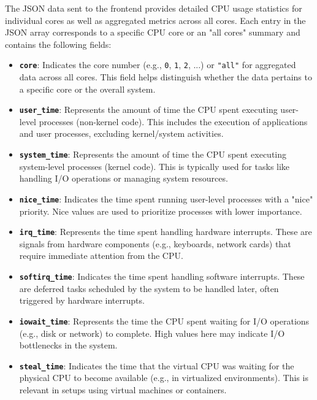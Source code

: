 \documentclass[12pt]{article}
\begin{document}
The JSON data sent to the frontend provides detailed CPU usage statistics for individual cores as well as aggregated metrics across all cores. Each entry in the JSON array corresponds to a specific CPU core or an "all cores" summary and contains the following fields:

\begin{itemize}
    \item \textbf{\texttt{core}}:  
    Indicates the core number (e.g., \texttt{0}, \texttt{1}, \texttt{2}, ...) or \texttt{"all"} for aggregated data across all cores. This field helps distinguish whether the data pertains to a specific core or the overall system.

    \item \textbf{\texttt{user\_time}}:  
    Represents the amount of time the CPU spent executing user-level processes (non-kernel code). This includes the execution of applications and user processes, excluding kernel/system activities.

    \item \textbf{\texttt{system\_time}}:  
    Represents the amount of time the CPU spent executing system-level processes (kernel code). This is typically used for tasks like handling I/O operations or managing system resources.

    \item \textbf{\texttt{nice\_time}}:  
    Indicates the time spent running user-level processes with a "nice" priority. Nice values are used to prioritize processes with lower importance.

    \item \textbf{\texttt{irq\_time}}:  
    Represents the time spent handling hardware interrupts. These are signals from hardware components (e.g., keyboards, network cards) that require immediate attention from the CPU.

    \item \textbf{\texttt{softirq\_time}}:  
    Indicates the time spent handling software interrupts. These are deferred tasks scheduled by the system to be handled later, often triggered by hardware interrupts.

    \item \textbf{\texttt{iowait\_time}}:  
    Represents the time the CPU spent waiting for I/O operations (e.g., disk or network) to complete. High values here may indicate I/O bottlenecks in the system.

    \item \textbf{\texttt{steal\_time}}:  
    Indicates the time that the virtual CPU was waiting for the physical CPU to become available (e.g., in virtualized environments). This is relevant in setups using virtual machines or containers.
\end{itemize}
\end{document}
